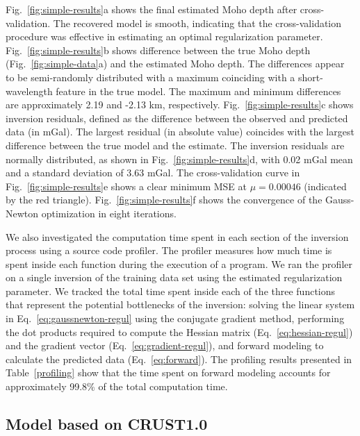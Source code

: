 \documentclass[extra,mreferee]{gji}
\begin{document}
Fig.~\ref{fig:simple-results}a shows the final estimated Moho depth
after cross-validation.
The recovered model is smooth, indicating that the cross-validation procedure
was effective in estimating an optimal regularization parameter.
Fig.~\ref{fig:simple-results}b shows difference between the true Moho depth
(Fig.~\ref{fig:simple-data}a) and the estimated Moho depth.
The differences appear to be semi-randomly distributed with a maximum
coinciding with a short-wavelength feature in the true model.
The maximum and minimum differences are approximately
2.19 and -2.13 km, respectively.
Fig.~\ref{fig:simple-results}c shows inversion residuals, defined as the
difference between the observed and predicted data (in mGal).
The largest residual (in absolute value) coincides with the largest difference
between the true model and the estimate.
The inversion residuals are normally distributed,
as shown in Fig.~\ref{fig:simple-results}d,
with 0.02 mGal mean and a standard deviation of 3.63 mGal.
The cross-validation curve in Fig.~\ref{fig:simple-results}e
shows a clear minimum MSE at $\mu = 0.00046$
(indicated by the red triangle).
Fig.~\ref{fig:simple-results}f shows the convergence of
the Gauss-Newton optimization in eight iterations.

We also investigated the computation time spent in each section of the inversion
process using a source code profiler.
The profiler measures how much time is spent inside each function during
the execution of a program.
We ran the profiler on a single inversion of the training data set
using the estimated regularization parameter.
We tracked the total time spent inside each of the three functions
that represent the potential bottlenecks of the inversion:
solving the linear system in Eq.~\ref{eq:gaussnewton-regul}
using the conjugate gradient method,
performing the dot products required to compute
the Hessian matrix (Eq.~\ref{eq:hessian-regul})
and the gradient vector (Eq.~\ref{eq:gradient-regul}),
and forward modeling to calculate the predicted data (Eq.~\ref{eq:forward}).
The profiling results presented in Table~\ref{profiling}
show that the time spent on forward modeling accounts for approximately
99.8\% of the total computation time.







\subsection{Model based on CRUST1.0}\label{sec:crust1}
\end{document}
